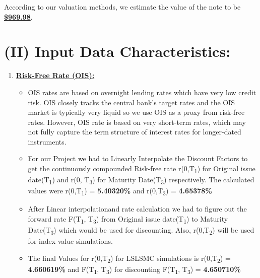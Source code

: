 \documentclass[12pt,a4paper]{article}
\begin{document}
\vspace{0.5cm}
According to our valuation methods, we estimate the value of the note to be \underline{\textbf{\$969.98}}.

\clearpage  %

\section*{(II) Input Data Characteristics:}
\begin{enumerate}
\label{app:ois}
\item \underline{\textbf{Risk-Free Rate (OIS):}}
	\begin{itemize}
	\item  OIS rates are based on overnight lending rates which have very low credit risk. OIS closely tracks the central bank's target rates and the OIS market is typically very liquid so we use OIS as a proxy from risk-free rates. However, OIS rate is based on very short-term rates, which may not fully capture the term structure of interest rates for longer-dated instruments.
	\item For our Project we had to Linearly Interpolate the Discount Factors to get the continuously compounded Risk-free rate r(0,T\textsubscript{1}) for Original issue date(T\textsubscript{1}) and  r(0, T\textsubscript{3}) for Maturity Date(T\textsubscript{3}) respectively. The calculated values were r(0,T\textsubscript{1}) = \textbf{5.40320\%} and r(0,T\textsubscript{3}) = \textbf{4.65378\%}
	\item After Linear interpolationand rate calculation we had to figure out the forward rate F(T\textsubscript{1}, T\textsubscript{3}) from Original issue date(T\textsubscript{1}) to Maturity Date(T\textsubscript{3}) which would be used for discounting. Also, r(0,T\textsubscript{2}) will be used for index value simulations.
	\item The final Values for  r(0,T\textsubscript{2})  for LSLSMC simulations is r(0,T\textsubscript{2}) = \textbf{4.660619\%} and  F(T\textsubscript{1}, T\textsubscript{3}) for discounting  F(T\textsubscript{1}, T\textsubscript{3}) = \textbf{4.650710\%}
	\end{itemize}


\end{enumerate}
\end{document}
